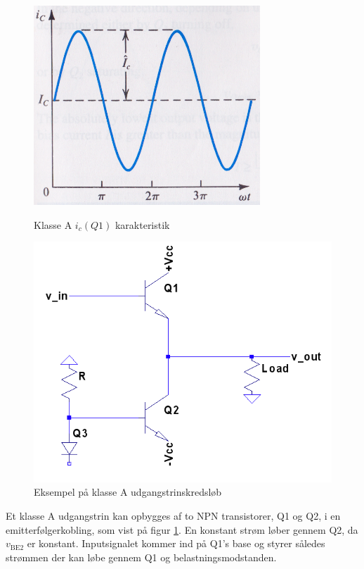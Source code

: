 \begin{figure}[ht]
\begin{minipage}[b]{0.5\linewidth}
\centering
\includegraphics[scale=.35]{valg_af_loesning/klasser/klassea.png}
\caption{Klasse A $i_c (Q1)$ karakteristik\cite{sedra-smith}}
\label{fig:klassea}
\end{minipage}
\hspace{0.5cm}
\begin{minipage}[b]{0.5\linewidth}
\centering
\includegraphics[scale=.35]{valg_af_loesning/klasser/classa.png}
\caption{Eksempel på klasse A udgangstrinskredsløb\cite{sedra-smith}}
\label{fig:classa}
\end{minipage}
\end{figure}


Et klasse A udgangstrin kan opbygges af to NPN transistorer, Q1 og Q2, i en emitterfølgerkobling, som vist på figur \ref{fig:classa}. En konstant strøm løber gennem Q2, da $v_{\mathrm{BE2}}$ er konstant. Inputsignalet kommer ind på Q1's base og styrer således strømmen der kan løbe gennem Q1 og belastningsmodstanden. 

